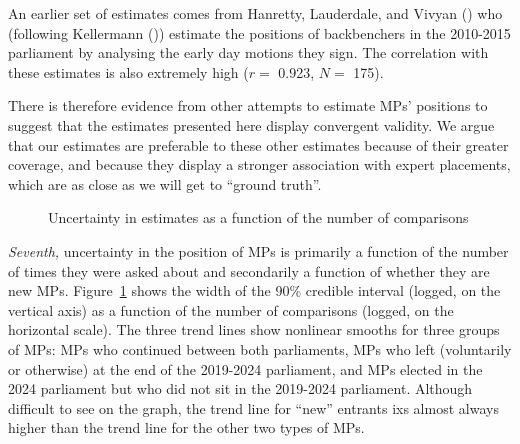 \documentclass[
]{article}
\begin{document}
An earlier set of estimates comes from Hanretty, Lauderdale, and Vivyan
() who (following Kellermann
()) estimate the positions
of backbenchers in the 2010-2015 parliament by analysing the early day
motions they sign. The correlation with these estimates is also
extremely high (\(r=\) 0.923, \(N=\) 175).

There is therefore evidence from other attempts to estimate MPs'
positions to suggest that the estimates presented here display
convergent validity. We argue that our estimates are preferable to these
other estimates because of their greater coverage, and because they
display a stronger association with expert placements, which are as
close as we will get to ``ground truth''.

\begin{figure}


\caption{\label{fig-uncertainty}Uncertainty in estimates as a function
of the number of comparisons}

\end{figure}%

\emph{Seventh,} uncertainty in the position of MPs is primarily a
function of the number of times they were asked about and secondarily a
function of whether they are new MPs. Figure~\ref{fig-uncertainty} shows
the width of the 90\% credible interval (logged, on the vertical axis)
as a function of the number of comparisons (logged, on the horizontal
scale). The three trend lines show nonlinear smooths for three groups of
MPs: MPs who continued between both parliaments, MPs who left
(voluntarily or otherwise) at the end of the 2019-2024 parliament, and
MPs elected in the 2024 parliament but who did not sit in the 2019-2024
parliament. Although difficult to see on the graph, the trend line for
``new'' entrants ixs almost always higher than the trend line for the
other two types of MPs.
\end{document}
